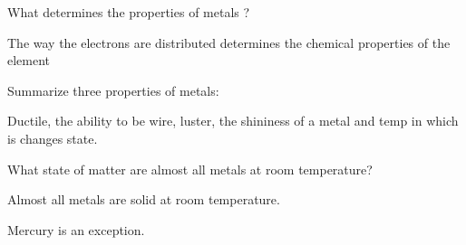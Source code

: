 {}  What determines the properties of metals ?

The way the electrons are distributed determines the chemical properties of the element 

\noindent Summarize three properties of metals: 

Ductile, the ability to be wire, luster, the shininess of a metal and temp in which is changes state. 

\noindent What state of matter are almost all metals at room temperature? 

Almost all metals are solid at room temperature. 

\noindent Mercury is an exception.
